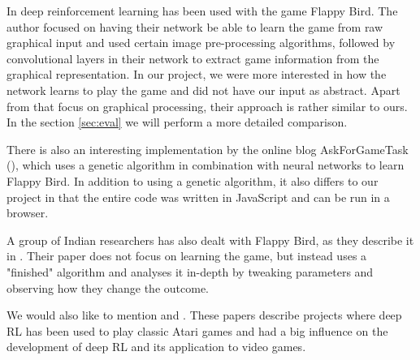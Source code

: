 In \cite{chendeep} deep reinforcement learning has been used with the game Flappy Bird. The author focused on having their network be able to learn the game from raw graphical input and used certain image pre-processing algorithms, followed by convolutional layers in their network to extract game information from the graphical representation. In our project, we were more interested in how the network learns to play the game and did not have our input as abstract. Apart from that focus on graphical processing, their approach is rather similar to ours. In the section \ref{sec:eval} we will perform a more detailed comparison.
\par
There is also an interesting implementation by the online blog AskForGameTask (\cite{geneticFB}), which uses a genetic algorithm in combination with neural networks to learn Flappy Bird. In addition to using a genetic algorithm, it also differs to our project in that the entire code was written in JavaScript and can be run in a browser.
\par
A group of Indian researchers has also dealt with Flappy Bird, as they describe it in \cite{performanceFB}. Their paper does not focus on learning the game, but instead uses a "finished" algorithm and analyses it in-depth by tweaking parameters and observing how they change the outcome.
\par
We would also like to mention \cite{playingatari} and \cite{humanlvl}. These papers describe projects where deep RL has been used to play classic Atari games and had a big influence on the development of deep RL and its application to video games.
